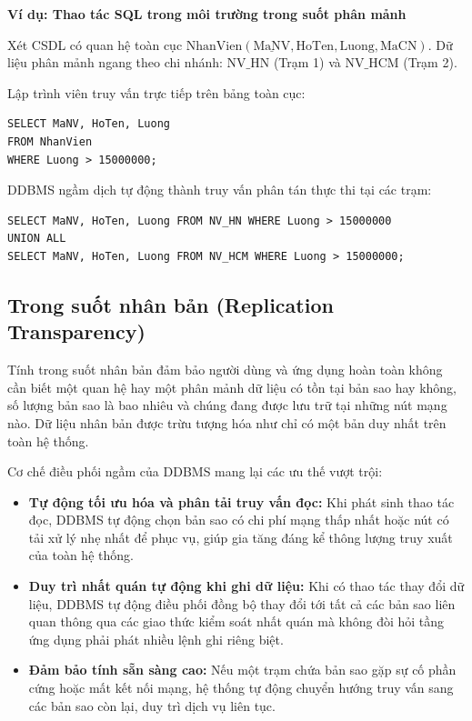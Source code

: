 \documentclass[12pt,a4paper]{report}
\newenvironment{viduBox}[1]{%
    \par\vspace{6pt}\noindent
    \begin{minipage}{\textwidth}
    \begin{mdframed}[style=viduStyle]%
    \noindent\textbf{\color{myblue}Ví dụ: #1}\par\vspace{4pt}\small
}{%
    \end{mdframed}%
    \end{minipage}\par\vspace{6pt}
}
\begin{document}
\begin{viduBox}{Thao tác SQL trong môi trường trong suốt phân mảnh}
Xét CSDL có quan hệ toàn cục $\text{NhanVien}(\underline{\text{MaNV}}, \text{HoTen}, \text{Luong}, \text{MaCN})$. Dữ liệu phân mảnh ngang theo chi nhánh: $\text{NV\_HN}$ (Trạm 1) và $\text{NV\_HCM}$ (Trạm 2).

Lập trình viên truy vấn trực tiếp trên bảng toàn cục:
\begin{lstlisting}
SELECT MaNV, HoTen, Luong 
FROM NhanVien 
WHERE Luong > 15000000;
\end{lstlisting}

DDBMS ngầm dịch tự động thành truy vấn phân tán thực thi tại các trạm:
\begin{lstlisting}
SELECT MaNV, HoTen, Luong FROM NV_HN WHERE Luong > 15000000
UNION ALL
SELECT MaNV, HoTen, Luong FROM NV_HCM WHERE Luong > 15000000;
\end{lstlisting}
\end{viduBox}

\subsection{Trong suốt nhân bản (Replication Transparency)}
Tính trong suốt nhân bản đảm bảo người dùng và ứng dụng hoàn toàn không cần biết một quan hệ hay một phân mảnh dữ liệu có tồn tại bản sao hay không, số lượng bản sao là bao nhiêu và chúng đang được lưu trữ tại những nút mạng nào. Dữ liệu nhân bản được trừu tượng hóa như chỉ có một bản duy nhất trên toàn hệ thống.

Cơ chế điều phối ngầm của DDBMS mang lại các ưu thế vượt trội:
\begin{itemize}[leftmargin=0.8cm, topsep=2pt, itemsep=2pt]
    \item \textbf{Tự động tối ưu hóa và phân tải truy vấn đọc:} Khi phát sinh thao tác đọc, DDBMS tự động chọn bản sao có chi phí mạng thấp nhất hoặc nút có tải xử lý nhẹ nhất để phục vụ, giúp gia tăng đáng kể thông lượng truy xuất của toàn hệ thống.
    \item \textbf{Duy trì nhất quán tự động khi ghi dữ liệu:} Khi có thao tác thay đổi dữ liệu, DDBMS tự động điều phối đồng bộ thay đổi tới tất cả các bản sao liên quan thông qua các giao thức kiểm soát nhất quán mà không đòi hỏi tầng ứng dụng phải phát nhiều lệnh ghi riêng biệt.
    \item \textbf{Đảm bảo tính sẵn sàng cao:} Nếu một trạm chứa bản sao gặp sự cố phần cứng hoặc mất kết nối mạng, hệ thống tự động chuyển hướng truy vấn sang các bản sao còn lại, duy trì dịch vụ liên tục.
\end{itemize}
\end{document}
